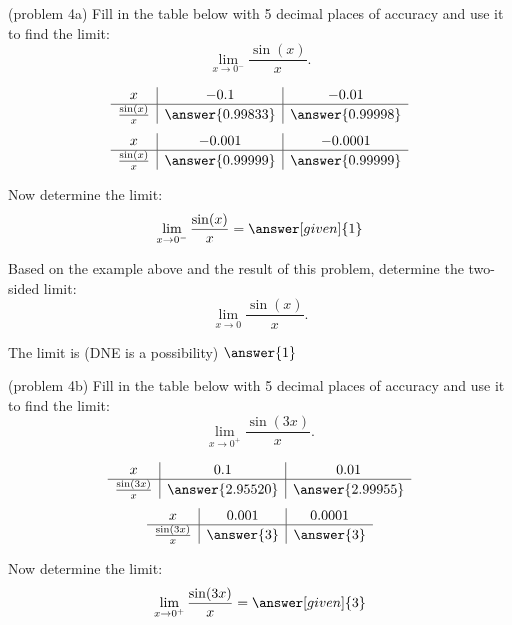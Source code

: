 \documentclass{ximera}
\begin{document}
\begin{problem}(problem 4a)
Fill in the table below with 5 decimal places of accuracy and use it to find the limit:
\[\lim_{x \to 0^-} \frac{\sin(x)}{x}.\]

\begin{prompt}
\begin{center}
\[
\begin{array}{ c | c | c }
  x & -0.1 & -0.01   \\ 
	\hline 
	 \frac{\sin(x)}{x} & \answer{0.99833} & \answer{0.99998} 
\end{array}
\]
\[
\begin{array}{ c | c | c  }
  x  & -0.001 & -0.0001 \\ 
	\hline 
	 \frac{\sin(x)}{x}  & \answer{0.99999} & \answer{0.99999}
\end{array}
\]
\end{center}
Now determine the limit:
\[
\lim_{x \to 0^-} \frac{\sin(x)}{x} = \answer[given]{1}
\]
\end{prompt}

Based on the example above and the result of this problem, determine the two-sided limit:
\[
\lim_{x \to 0} \frac{\sin(x)}{x}.
\]

The limit is (DNE is a possibility) $\answer{1}$
\end{problem}



\begin{problem}(problem 4b)
Fill in the table below with 5 decimal places of accuracy and use it to find the limit:
\[\lim_{x \to 0^+} \frac{\sin(3x)}{x}.\]

\begin{prompt}
\begin{center}
\[
\begin{array}{ c | c | c }
  x & 0.1 & 0.01   \\ 
	\hline 
	 \frac{\sin(3x)}{x} & \answer{2.95520} & \answer{2.99955} 
\end{array}
\]
\[
\begin{array}{ c | c | c  }
  x  & 0.001 & 0.0001 \\ 
	\hline 
	 \frac{\sin(3x)}{x}  & \answer{3} & \answer{3}
\end{array}
\]
\end{center}
Now determine the limit:
\[
\lim_{x \to 0^+} \frac{\sin(3x)}{x} = \answer[given]{3}
\]
\end{prompt}
\end{problem}
\end{document}
